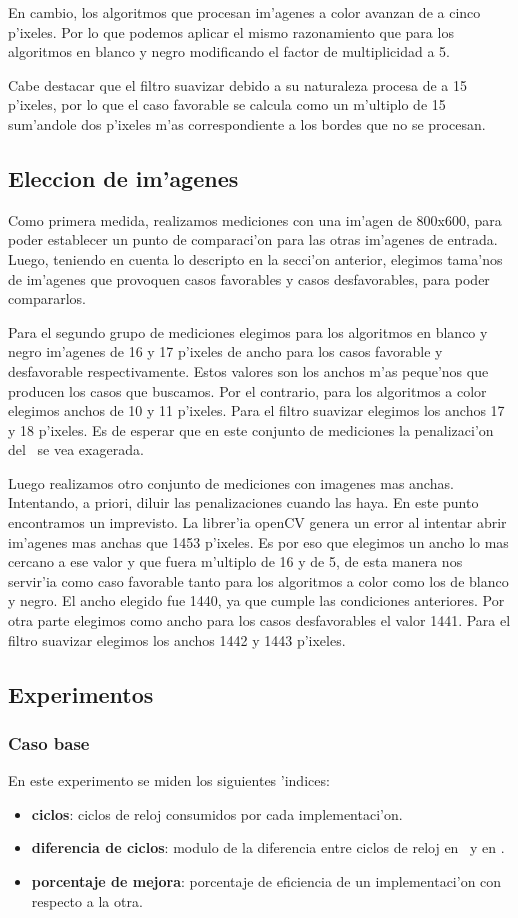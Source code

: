 En cambio, los algoritmos que procesan im'agenes a color avanzan de a cinco p'ixeles. Por lo que podemos aplicar el mismo razonamiento que para los algoritmos en blanco y negro modificando el factor de multiplicidad a 5.

Cabe destacar que el filtro suavizar debido a su naturaleza procesa de a 15 p'ixeles, por lo que el caso favorable se calcula como un m'ultiplo de 15 sum'andole dos p'ixeles m'as correspondiente a los bordes que no se procesan.

\subsection{Eleccion de im'agenes}
Como primera medida, realizamos mediciones con una im'agen de 800x600, para poder establecer un punto de comparaci'on para las otras im'agenes de entrada. Luego, teniendo en cuenta lo descripto en la secci'on anterior, elegimos tama'nos de im'agenes que provoquen casos favorables y casos desfavorables, para poder compararlos. 

Para el segundo grupo de mediciones elegimos para los algoritmos en blanco y negro im'agenes de 16 y 17 p'ixeles de ancho para los casos favorable y desfavorable respectivamente. Estos valores son los anchos m'as peque'nos que producen los casos que buscamos. Por el contrario, para los algoritmos a color elegimos anchos de 10 y 11 p'ixeles. Para el filtro suavizar elegimos los anchos 17 y 18 p'ixeles. Es de esperar que en este conjunto de mediciones la penalizaci'on del \ass \ se vea exagerada.

Luego realizamos otro conjunto de mediciones con imagenes mas anchas. Intentando, a priori, diluir las penalizaciones cuando las haya. En este punto encontramos un imprevisto. La librer'ia openCV genera un error al intentar abrir im'agenes mas anchas que 1453 p'ixeles. Es por eso que elegimos un ancho lo mas cercano a ese valor y que fuera m'ultiplo de 16 y de 5, de esta manera nos servir'ia como caso favorable tanto para los algoritmos a color como los de blanco y negro. El ancho elegido fue 1440, ya que cumple las condiciones anteriores. Por otra parte elegimos como ancho para los casos desfavorables el valor 1441. Para el filtro suavizar elegimos los anchos 1442 y 1443 p'ixeles.


\subsection{Experimentos}
\subsubsection{Caso base}
En este experimento se miden los siguientes 'indices:
\begin{itemize}
 \item \textbf{ciclos}: ciclos de reloj consumidos por cada implementaci'on.
 \item \textbf{diferencia de ciclos}: modulo de la diferencia entre ciclos de reloj en \C \ y en \ass.
 \item \textbf{porcentaje de mejora}: porcentaje de eficiencia de un implementaci'on con respecto a la otra.
\end{itemize}

